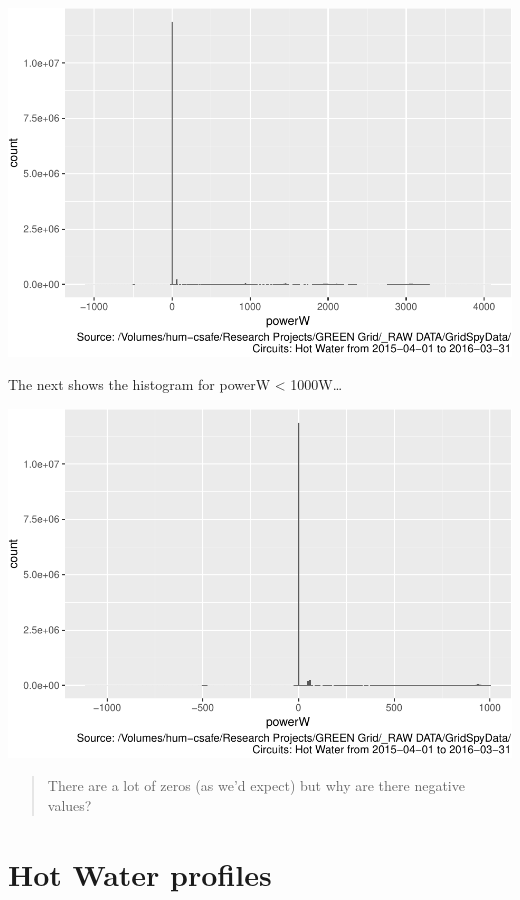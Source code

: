\documentclass[]{article}
\begin{document}
\includegraphics{nzGGHouseholdPowerDemandProfile_Hot Water_2015-04-01_2016-03-31_files/figure-latex/histo full-1.pdf}

The next shows the histogram for powerW \textless{} 1000W\ldots{}

\includegraphics{nzGGHouseholdPowerDemandProfile_Hot Water_2015-04-01_2016-03-31_files/figure-latex/histo power under 1000-1.pdf}

\begin{quote}
There are a lot of zeros (as we'd expect) but why are there negative
values?
\end{quote}

\section{Hot Water profiles}\label{hot-water-profiles}
\end{document}
